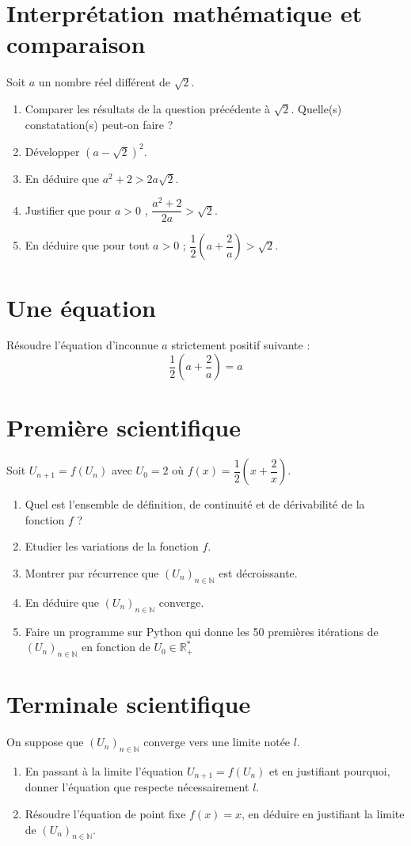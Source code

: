 \documentclass[french]{article}
\begin{document}
\section*{Interprétation mathématique et comparaison}
Soit $a$ un nombre réel différent de $\sqrt2$.

\begin{enumerate}
\item Comparer les résultats de la question précédente à $\sqrt{2}$. Quelle(s) constatation(s) peut-on faire ?
\item Développer $(a-\sqrt{2})^2$.
\item En déduire que $a^2+2 > 2a\sqrt{2}$.
\item Justifier que pour $a>0$ , $\dfrac{a^2+2}{2a}> \sqrt{2}$.
\item En déduire que pour tout $a>0$ ; $\dfrac{1}{2} (a+ \dfrac{2}{a})>\sqrt{2}$.
\end{enumerate}

\section*{Une équation}

Résoudre l'équation d'inconnue $a$ strictement positif suivante : $$\dfrac{1}{2} (a+ \dfrac{2}{a})=a$$

\section*{Première scientifique}

Soit $U_{n+1}=f(U_n)$ avec $U_0=2$ où $f(x)=\dfrac{1}{2}(x+\dfrac{2}{x})$.

\begin{enumerate}
\item Quel est l'ensemble de définition, de continuité et de dérivabilité de la fonction $f$ ?
\item Etudier les variations de la fonction $f$.
\item Montrer par récurrence que $(U_n)_{n\in \mathbb{N}}$ est décroissante.
\item En déduire que $(U_n)_{n\in \mathbb{N}} $ converge.
\item Faire un programme sur Python qui donne les 50 premières itérations de $(U_n)_{n\in \mathbb{N}}$ en fonction de $U_0 \in \mathbb{R}^*_+ $
\end{enumerate}

\section*{Terminale scientifique}
On suppose que $(U_n)_{n\in \mathbb{N}} $ converge vers une limite notée $l$.
\begin{enumerate}
\item En passant à la limite l'équation $U_{n+1}=f(U_n)$  et en justifiant pourquoi, donner l'équation que respecte nécessairement $l$.
\item Résoudre l'équation de point fixe $f(x)=x$, en déduire en justifiant la limite de $(U_n)_{n\in \mathbb{N}} $.
\end{enumerate}
\end{document}
